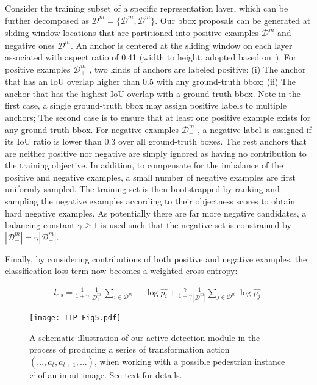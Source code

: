 \documentclass[10pt,journal,compsoc,twoside]{IEEEtran}
\begin{document}
Consider the training subset of a specific representation layer, which can be further decomposed as $\mathcal{D}^m=\{\mathcal{D}_+^m, \mathcal{D}_-^m \}$.
Our bbox proposals can be generated at sliding-window locations that are partitioned into positive examples $\mathcal{D}_+^m$ and negative ones $\mathcal{D}_-^m$.
An anchor is centered at the sliding window on each layer associated with aspect ratio of 0.41 (width to height, adopted based on~\cite{DolEtAl:cvpr09}).
For positive examples $\mathcal{D}_+^m$ , two kinds of anchors are labeled positive:
(i) The anchor that has an IoU overlap higher than 0.5 with any ground-truth bbox; (ii) The anchor that has the highest IoU overlap with a ground-truth bbox.
Note in the first case, a single ground-truth bbox may assign positive labels to multiple anchors;
The second case is to ensure that at least one positive example exists for any ground-truth bbox.  For negative examples $\mathcal{D}_-^m$ , a negative label is assigned if its IoU ratio is lower than 0.3 over all ground-truth boxes. The rest anchors that are neither positive nor negative are simply ignored as having no contribution to the training objective.
%
In addition, to compensate for the imbalance of the positive and negative examples,
a small number of negative examples are first uniformly sampled.
The training set is then bootstrapped by ranking and sampling the negative examples according to their objectness scores to obtain hard negative examples.
As potentially there are far more negative candidates, a balancing constant $\gamma\geq 1$ is used
such that the negative set is constrained by $\left| \mathcal{D}_-^m \right|=\gamma \left| \mathcal{D}_+^m \right|$.

Finally, by considering contributions of both positive and negative examples, the classification loss term now becomes a weighted cross-entropy:
\begin{small}
\begin{align}
\label{eq_l_cls}
l_{\mathrm{cls}}=\frac{1}{1+\gamma}\frac{1}{\left| \mathcal{D}_+^m \right|} \sum\limits_{i\in{\mathcal{D}_+^m}}-\log \hat{p_i} + \frac{\gamma}{1+\gamma}\frac{1}{\left| \mathcal{D}_-^m \right|} \sum\limits_{j\in{\mathcal{D}_-^m}} \log \hat{p_j}.
\end{align}
\end{small}



\begin{figure}[!t]
\centering
\texttt{[image: TIP\_Fig5.pdf]}
\caption{A schematic illustration of our active detection module in the process of producing a series of transformation action $\left( \ldots, a_t, a_{t+1}, \ldots \right)$, when working with a possible pedestrian instance $\vec{x}$ of an input image. See text for details.}
\label{fig_5}
\end{figure}
\end{document}
